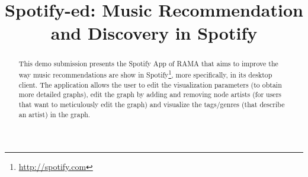 \documentclass{article}
\title{Spotify-ed: Music Recommendation and Discovery in Spotify}
\begin{document}
%
\maketitle
%
\begin{abstract}
  This demo submission presents the Spotify App\cite{spotifyapps} of RAMA \cite{ramaapp} that aims to improve the way music recommendations are show in Spotify\footnote{\url{http://spotify.com}}, more specifically, in its desktop client.
  The application allows the user to edit the visualization parameters (to obtain more detailed graphs), edit the graph by adding and removing node artists (for users that want to meticulously edit the graph) and visualize the tags/genres (that describe an artist) in the graph.



\end{abstract}

\section{} %
\label{sec:}









\end{document}

